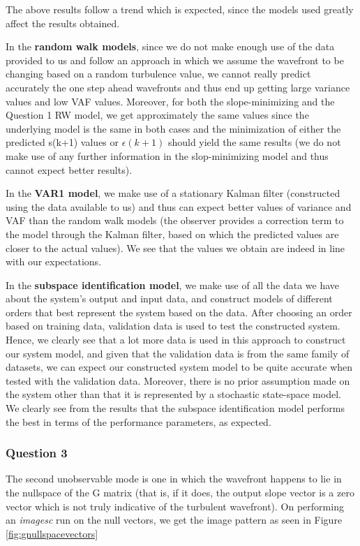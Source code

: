 \documentclass[12pt]{report}
\begin{document}
The above results follow a trend which is expected, since the models used greatly affect the results obtained.

In the \textbf{random walk models}, since we do not make enough use of the data provided to us and follow an approach in which we assume the wavefront to be changing based on a random turbulence value, we cannot really predict accurately the one step ahead wavefronts and thus end up getting large variance values and low VAF values. Moreover, for both the slope-minimizing and the Question 1 RW model, we get approximately the same values since the underlying model is the same in both cases and the minimization of either the predicted s(k+1) values or $\epsilon(k+1)$ should yield the same results (we do not make use of any further information in the slop-minimizing model and thus cannot expect better results).

In the \textbf{VAR1 model}, we make use of a stationary Kalman filter (constructed using the data available to us) and thus can expect better values of variance and VAF than the random walk models (the observer provides a correction term to the model through the Kalman filter, based on which the predicted values are closer to the actual values). We see that the values we obtain are indeed in line with our expectations.

In the \textbf{subspace identification model}, we make use of all the data we have about the system's output and input data, and construct models of different orders that  best represent the system based on the data. After choosing an order based on training data, validation data is used to test the constructed system. Hence, we clearly see that a lot more data is used in this approach to construct our system model, and given that the validation data is from the same family of datasets, we can expect our constructed system model to be quite accurate when tested with the validation data. Moreover, there is no prior assumption made on the system other than that it is represented by a stochastic state-space model. We clearly see from the results that the subspace identification model performs the best in terms of the performance parameters, as expected.

\subsubsection*{Question 3}

The second unobservable mode is one in which the wavefront happens to lie in the nullspace of the G matrix (that is, if it does, the output slope vector is a zero vector which is not truly indicative of the turbulent wavefront). On performing an \textit{imagesc} run on the null vectors, we get the image pattern as seen in Figure \ref{fig:gnullspacevectors}
\end{document}
